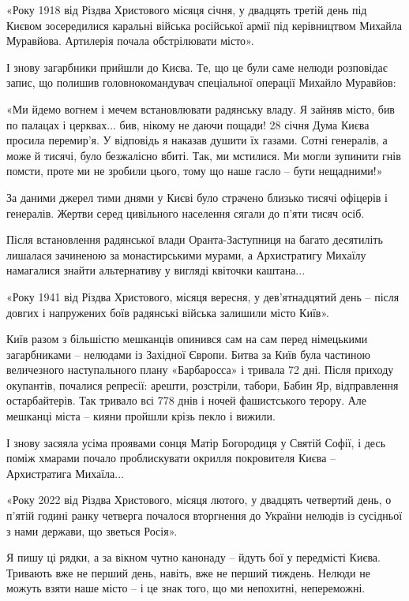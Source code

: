 «Року 1918 від Різдва Христового місяця січня, у двадцять третій день під
Києвом зосередилися каральні війська російської армії під керівництвом Михайла
Муравйова. Артилерія почала обстрілювати місто».

І знову загарбники прийшли до Києва. Те, що це були саме нелюди розповідає
запис, що полишив головнокомандувач спеціальної операції Михайло Муравйов:

«Ми йдемо вогнем і мечем встановлювати радянську владу. Я зайняв місто, бив по
палацах і церквах... бив, нікому не даючи пощади! 28 січня Дума Києва просила
перемир’я. У відповідь я наказав душити їх газами. Сотні генералів, а може й
тисячі, було безжалісно вбиті. Так, ми мстилися. Ми могли зупинити гнів помсти,
проте ми не зробили цього, тому що наше гасло – бути нещадними!»

За даними джерел тими днями у Києві було страчено близько тисячі офіцерів і
генералів. Жертви серед цивільного населення сягали до п’яти тисяч осіб.

Після встановлення радянської влади Оранта-Заступниця на багато десятиліть
лишалася зачиненою за монастирськими мурами, а Архистратигу Михаїлу намагалися
знайти альтернативу у вигляді квіточки каштана...

«Року 1941 від Різдва Христового, місяця вересня, у дев’ятнадцятий день – після
довгих і напружених боїв радянські війська залишили місто Київ».

Київ разом з більшістю мешканців опинився сам на сам перед німецькими
загарбниками -- нелюдами із Західної Європи. Битва за Київ була частиною
величезного наступального плану «Барбаросса» і тривала 72 дні. Після приходу
окупантів, почалися репресії: арешти, розстріли, табори, Бабин Яр, відправлення
остарбайтерів. Так тривало всі 778 днів і ночей фашистського терору. Але
мешканці міста – кияни пройшли крізь пекло і вижили.

І знову засяяла усіма проявами сонця Матір Богородиця у Святій Софії, і десь
поміж хмарами почало проблискувати окрилля покровителя Києва – Архистратига
Михаїла...

«Року 2022 від Різдва Христового, місяця лютого, у двадцять четвертий день, о
п’ятій годині ранку четверга почалося вторгнення до України нелюдів із
сусідньої з нами держави, що зветься Росія».

Я пишу ці рядки, а за вікном чутно канонаду – йдуть бої у передмісті Києва.
Тривають вже не перший день, навіть, вже не перший тиждень. Нелюди не можуть
взяти наше місто – і це знак того, що ми непохитні, непереможні.

